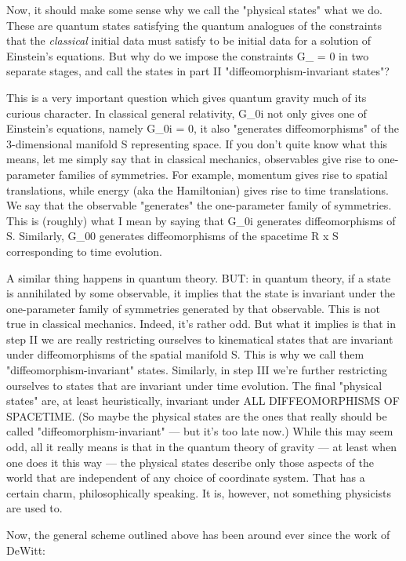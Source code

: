 Now, it should make some sense why we call the "physical states" what we
do.  These are quantum states satisfying the quantum analogues of the
constraints that the \emph{classical} initial data must satisfy to be initial
data for a solution of Einstein's equations.  But why do we impose the
constraints G_{\mu  \nu } = 0 in two separate stages, and call the states in
part II "diffeomorphism-invariant states"?

This is a very important question which gives quantum gravity much of
its curious character.  In classical general relativity, G_{0i} not only
gives one of Einstein's equations, namely G_{0i} = 0, it also "generates
diffeomorphisms" of the 3-dimensional manifold S representing space.  If
you don't quite know what this means, let me simply say that in
classical mechanics, observables give rise to one-parameter families of
symmetries.  For example, momentum gives rise to spatial translations, while
energy (aka the Hamiltonian) gives rise to time translations.  We say
that the observable "generates" the one-parameter family of symmetries.
This is (roughly) what I mean by saying that G_{0i} generates
diffeomorphisms of S.  Similarly, G_{00} generates diffeomorphisms of
the spacetime R x S corresponding to time evolution.

A similar thing happens in quantum theory.  BUT: in quantum theory, if a
state is annihilated by some observable, it implies that the state is
invariant under the one-parameter family of symmetries generated by that
observable.  This is not true in classical mechanics.  Indeed, it's
rather odd.  But what it implies is that in step II we are really
restricting ourselves to kinematical states that are invariant under
diffeomorphisms of the spatial manifold S.  This is why we call them
"diffeomorphism-invariant" states.  Similarly, in step III we're further
restricting ourselves to states that are invariant under time evolution.
The final "physical states" are, at least heuristically, invariant under
ALL DIFFEOMORPHISMS OF SPACETIME.  (So maybe the physical states are the
ones that really should be called "diffeomorphism-invariant" --- but
it's too late now.)  While this may seem odd, all it really means is
that in the quantum theory of gravity --- at least when one does it this
way --- the physical states describe only those aspects of the world
that are independent of any choice of coordinate system.  That has a
certain charm, philosophically speaking.  It is, however, not something
physicists are used to.

Now, the general scheme outlined above has been around ever since the
work of DeWitt:

